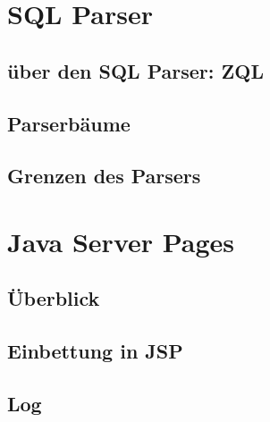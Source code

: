 \section{SQL Parser}

\subsection{über den SQL Parser: ZQL}

\subsection{Parserbäume}

\subsection{Grenzen des Parsers}

\section{Java Server Pages}

\subsection{Überblick}

\subsection{Einbettung in JSP}

\subsection{Log}